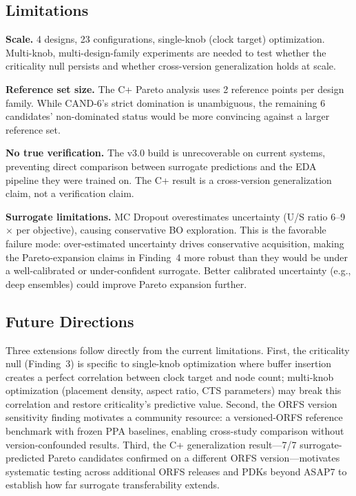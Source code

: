 \documentclass[conference]{IEEEtran}
\begin{document}
\subsection{Limitations}

\textbf{Scale.} 4 designs, 23 configurations, single-knob (clock target)
optimization. Multi-knob, multi-design-family experiments are needed to test
whether the criticality null persists and whether cross-version generalization
holds at scale.

\textbf{Reference set size.} The C+ Pareto analysis uses 2 reference points
per design family. While CAND-6's strict domination is unambiguous, the
remaining 6 candidates' non-dominated status would be more convincing against
a larger reference set.

\textbf{No true verification.} The v3.0 build is unrecoverable on current
systems, preventing direct comparison between surrogate predictions and the
EDA pipeline they were trained on. The C+ result is a cross-version
generalization claim, not a verification claim.

\textbf{Surrogate limitations.} MC Dropout overestimates uncertainty (U/S
ratio 6--9$\times$ per objective), causing conservative BO exploration. This
is the favorable failure mode: over-estimated uncertainty drives conservative
acquisition, making the Pareto-expansion claims in Finding~4 more robust than
they would be under a well-calibrated or under-confident surrogate. Better
calibrated uncertainty (e.g., deep ensembles) could improve Pareto
expansion further.

\subsection{Future Directions}

Three extensions follow directly from the current limitations.
First, the criticality null (Finding~3) is specific to single-knob
optimization where buffer insertion creates a perfect correlation between
clock target and node count; multi-knob optimization (placement density,
aspect ratio, CTS parameters) may break this correlation and restore
criticality's predictive value.
Second, the ORFS version sensitivity finding motivates a community resource:
a versioned-ORFS reference benchmark with frozen PPA baselines, enabling
cross-study comparison without version-confounded results.
Third, the C+ generalization result—7/7 surrogate-predicted Pareto candidates
confirmed on a different ORFS version—motivates systematic testing across
additional ORFS releases and PDKs beyond ASAP7 to establish how far
surrogate transferability extends.
\end{document}
